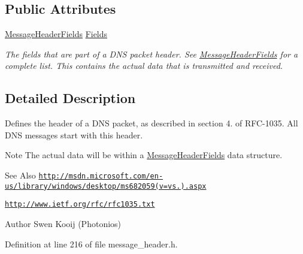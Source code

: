 \subsection*{Public Attributes}
\begin{DoxyCompactItemize}
\item 
\hyperlink{struct_senergy_1_1_dns_1_1_message_header_fields}{Message\-Header\-Fields} \hyperlink{class_senergy_1_1_dns_1_1_message_header_a014c173ce2b2c5bb06ae9e5d0e201159}{Fields}
\begin{DoxyCompactList}\small\item\em The fields that are part of a D\-N\-S packet header. See \hyperlink{struct_senergy_1_1_dns_1_1_message_header_fields}{Message\-Header\-Fields} for a complete list. This contains the actual data that is transmitted and received. \end{DoxyCompactList}\end{DoxyCompactItemize}


\subsection{Detailed Description}
Defines the header of a D\-N\-S packet, as described in section 4. of R\-F\-C-\/1035. All D\-N\-S messages start with this header. 

\begin{DoxyNote}{Note}
The actual data will be within a \hyperlink{struct_senergy_1_1_dns_1_1_message_header_fields}{Message\-Header\-Fields} data structure.
\end{DoxyNote}
\begin{DoxySeeAlso}{See Also}
\href{http://msdn.microsoft.com/en-us/library/windows/desktop/ms682059(v=vs.85).aspx}{\tt http\-://msdn.\-microsoft.\-com/en-\/us/library/windows/desktop/ms682059(v=vs.).\-aspx} 

\href{http://www.ietf.org/rfc/rfc1035.txt}{\tt http\-://www.\-ietf.\-org/rfc/rfc1035.\-txt}
\end{DoxySeeAlso}
\begin{DoxyAuthor}{Author}
Swen Kooij (Photonios) 
\end{DoxyAuthor}


Definition at line 216 of file message\-\_\-header.\-h.



